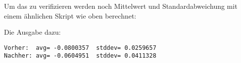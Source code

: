 \begin{enumerate}
\begin{enumerate}
        Um das zu verifizieren werden noch Mittelwert und Standardabweichung mit
        einem ähnlichen Skript wie oben berechnet:
        
        Die Ausgabe dazu:
        \begin{verbatim}
Vorher:  avg= -0.0800357  stddev= 0.0259657
Nachher: avg= -0.0604951  stddev= 0.0411328
        \end{verbatim}
    \end{enumerate}
\end{enumerate}
